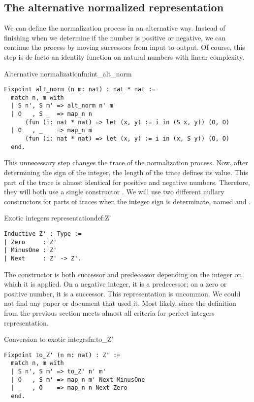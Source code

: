 \subsection{The alternative normalized representation}
We can define the normalization process in an alternative way. Instead of finishing when we determine if the number is positive or negative, we can continue the process by moving successors from input to output. Of course, this step is de facto an identity function on natural numbers with linear complexity.
\begin{func}{Alternative normalization}{fn:int_alt_norm}
\begin{verbatim}
Fixpoint alt_norm (n m: nat) : nat * nat :=
  match n, m with
  | S n', S m' => alt_norm n' m'
  | O   , S _  => map_n n 
      (fun (i: nat * nat) => let (x, y) := i in (S x, y)) (O, O)
  | O   , _    => map_n m 
      (fun (i: nat * nat) => let (x, y) := i in (x, S y)) (O, O)
  end.
\end{verbatim}
\end{func}
This unnecessary step changes the trace of the normalization process. Now, after determining the sign of the integer, the length of the trace defines its value. This part of the trace is almost identical for positive and negative numbers. Therefore, they will both use a single constructor . We will use two different nullary constructors for parts of traces when the integer sign is determinate, named  and .
\begin{defi}{Exotic integers representation}{def:Z'}
\begin{verbatim}
Inductive Z' : Type :=
| Zero     : Z'
| MinusOne : Z'
| Next     : Z' -> Z'.
\end{verbatim}
\end{defi}
The  constructor is both successor and predecessor depending on the integer on which it is applied. On a negative integer, it is a predecessor; on a zero or positive number, it is a successor. This representation is uncommon. We could not find any paper or document that used it. Most likely, since the definition from the previous section meets almost all criteria for perfect integers representation.
\begin{func}{Conversion to exotic integrs}{fn:to_Z'}
\begin{verbatim}
Fixpoint to_Z' (n m: nat) : Z' :=
  match n, m with
  | S n', S m' => to_Z' n' m'
  | O   , S m' => map_n m' Next MinusOne
  | _   , O    => map_n n Next Zero
  end.
\end{verbatim}
\end{func}
